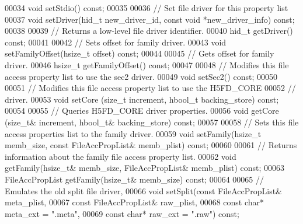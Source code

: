 \begin{DoxyCode}
00034         \textcolor{keywordtype}{void} setStdio() \textcolor{keyword}{const};
00035 
00036         \textcolor{comment}{// Set file driver for this property list}
00037         \textcolor{keywordtype}{void} setDriver(hid\_t new\_driver\_id, \textcolor{keyword}{const} \textcolor{keywordtype}{void} *new\_driver\_info) \textcolor{keyword}{const};
00038 
00039         \textcolor{comment}{// Returns a low-level file driver identifier.}
00040         hid\_t getDriver() \textcolor{keyword}{const};
00041 
00042         \textcolor{comment}{// Sets offset for family driver.}
00043         \textcolor{keywordtype}{void} setFamilyOffset(hsize\_t offset) \textcolor{keyword}{const};
00044 
00045         \textcolor{comment}{// Gets offset for family driver.}
00046         hsize\_t getFamilyOffset() \textcolor{keyword}{const};
00047 
00048         \textcolor{comment}{// Modifies this file access property list to use the sec2 driver.}
00049         \textcolor{keywordtype}{void} setSec2() \textcolor{keyword}{const};
00050 
00051         \textcolor{comment}{// Modifies this file access property list to use the H5FD\_CORE}
00052         \textcolor{comment}{// driver.}
00053         \textcolor{keywordtype}{void} setCore (\textcolor{keywordtype}{size\_t} increment, hbool\_t backing\_store) \textcolor{keyword}{const};
00054 
00055         \textcolor{comment}{// Queries H5FD\_CORE driver properties.}
00056         \textcolor{keywordtype}{void} getCore (\textcolor{keywordtype}{size\_t}& increment, hbool\_t& backing\_store) \textcolor{keyword}{const};
00057 
00058         \textcolor{comment}{// Sets this file access properties list to the family driver.}
00059         \textcolor{keywordtype}{void} setFamily(hsize\_t memb\_size, \textcolor{keyword}{const} FileAccPropList& memb\_plist) \textcolor{keyword}{const};
00060 
00061         \textcolor{comment}{// Returns information about the family file access property list.}
00062         \textcolor{keywordtype}{void} getFamily(hsize\_t& memb\_size, FileAccPropList& memb\_plist) \textcolor{keyword}{const};
00063         FileAccPropList getFamily(hsize\_t& memb\_size) \textcolor{keyword}{const};
00064 
00065         \textcolor{comment}{// Emulates the old split file driver,}
00066         \textcolor{keywordtype}{void} setSplit(\textcolor{keyword}{const} FileAccPropList& meta\_plist,
00067                       \textcolor{keyword}{const} FileAccPropList& raw\_plist,
00068                       \textcolor{keyword}{const} \textcolor{keywordtype}{char}* meta\_ext = \textcolor{stringliteral}{".meta"},
00069                       \textcolor{keyword}{const} \textcolor{keywordtype}{char}* raw\_ext = \textcolor{stringliteral}{".raw"}) \textcolor{keyword}{const};

\end{DoxyCode}
